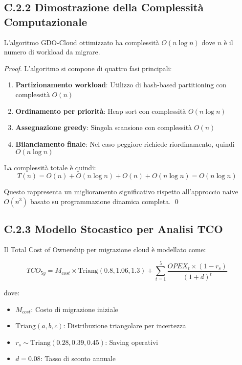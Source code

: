 \subsection{\texorpdfstring{\textbf{C.2.2 Dimostrazione della Complessità Computazionale}}{C.2.2 - Dimostrazione della Complessità Computazionale}}

\begin{theorem}
L'algoritmo GDO-Cloud ottimizzato ha complessità $O(n \log n)$ dove $n$ è il numero di workload da migrare.
\end{theorem}

\begin{proof}
L'algoritmo si compone di quattro fasi principali:
\begin{enumerate}
    \item \textbf{Partizionamento workload}: Utilizzo di hash-based partitioning con complessità $O(n)$
    \item \textbf{Ordinamento per priorità}: Heap sort con complessità $O(n \log n)$
    \item \textbf{Assegnazione greedy}: Singola scansione con complessità $O(n)$
    \item \textbf{Bilanciamento finale}: Nel caso peggiore richiede riordinamento, quindi $O(n \log n)$
\end{enumerate}

La complessità totale è quindi:
$$T(n) = O(n) + O(n \log n) + O(n) + O(n \log n) = O(n \log n)$$

Questo rappresenta un miglioramento significativo rispetto all'approccio naive $O(n^3)$ basato su programmazione dinamica completa. \qed
\end{proof}

\subsection{\texorpdfstring{\textbf{C.2.3 Modello Stocastico per Analisi TCO}}{C.2.3 - Modello Stocastico per Analisi TCO}}

Il Total Cost of Ownership per migrazione cloud è modellato come:

\begin{equation}
TCO_{5y} = M_{cost} \times \text{Triang}(0.8, 1.06, 1.3) + \sum_{t=1}^{5} \frac{OPEX_t \times (1 - r_s)}{(1 + d)^t}
\label{eq:tco}
\end{equation}

dove:
\begin{itemize}
    \item $M_{cost}$: Costo di migrazione iniziale
    \item $\text{Triang}(a,b,c)$: Distribuzione triangolare per incertezza
    \item $r_s \sim \text{Triang}(0.28, 0.39, 0.45)$: Saving operativi
    \item $d = 0.08$: Tasso di sconto annuale
\end{itemize}

